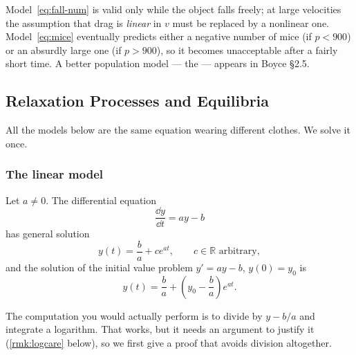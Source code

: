 \begin{remark}[Limitations]
	Model~\eqref{eq:fall-num} is valid only while the object falls freely; at large
	velocities the assumption that drag is \emph{linear} in \(v\) must be replaced by a
	nonlinear one. Model~\eqref{eq:mice} eventually predicts either a negative number of
	mice (if \(p < 900\)) or an absurdly large one (if \(p > 900\)), so it becomes
	unacceptable after a fairly short time. A better population model --- the
	 --- appears in Boyce §2.5.
\end{remark}

\subsection{Relaxation Processes and Equilibria}\label{sec:relax}

All the models below are the same equation wearing different clothes. We solve it once.

\subsubsection*{The linear model}

\begin{theorem}[General solution of \(y' = ay - b\)]\label{thm:linear-const}
	Let \(a \neq 0\). The differential equation
	\begin{equation}\label{eq:linear-const}
		\frac{\dd y}{\dd t} = ay - b
	\end{equation}
	has general solution
	\begin{equation}\label{eq:gensol}
		y(t) = \frac{b}{a} + c e^{at}, \qquad c \in \mathbb{R} \text{ arbitrary},
	\end{equation}
	and the solution of the initial value problem \(y' = ay-b\), \(y(0) = y_0\) is
	\begin{equation}\label{eq:ivpsol}
		y(t) = \frac{b}{a} + \left( y_0 - \frac{b}{a} \right) e^{at}.
	\end{equation}
\end{theorem}

The computation you would actually perform is to divide by \(y - b/a\) and integrate a
logarithm. That works, but it needs an argument to justify it (\autoref{rmk:logcare}
below), so we first give a proof that avoids division altogether.


